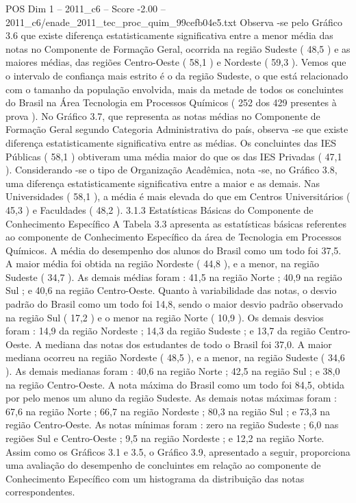 \begin{textsample}{POS Dim 1 – 2011\_c6 – Score -2.00 – 2011\_c6/enade\_2011\_tec\_proc\_quim\_99cefb04e5.txt}
Observa -se pelo Gráfico 3.6 que existe diferença estatisticamente significativa entre a menor média das notas no Componente de Formação Geral, ocorrida na região Sudeste ( 48,5 ) e as maiores médias, das regiões Centro-Oeste ( 58,1 ) e Nordeste ( 59,3 ).
Vemos que o intervalo de confiança mais estrito é o da região Sudeste, o que está relacionado com o tamanho da população envolvida, mais da metade de todos os concluintes do Brasil na Área Tecnologia em Processos Químicos ( 252 dos 429 presentes à prova ).
No Gráfico 3.7, que representa as notas médias no Componente de Formação Geral segundo Categoria Administrativa do país, observa -se que existe diferença estatisticamente significativa entre as médias.
Os concluintes das IES Públicas ( 58,1 ) obtiveram uma média maior do que os das IES Privadas ( 47,1 ).
Considerando -se o tipo de Organização Acadêmica, nota -se, no Gráfico 3.8, uma diferença estatisticamente significativa entre a maior e as demais.
Nas Universidades ( 58,1 ), a média é mais elevada do que em Centros Universitários ( 45,3 ) e Faculdades ( 48,2 ). 3.1.3 Estatísticas Básicas do Componente de Conhecimento Específico A Tabela 3.3 apresenta as estatísticas básicas referentes ao componente de Conhecimento Específico da área de Tecnologia em Processos Químicos.
A média do desempenho dos alunos do Brasil como um todo foi 37,5.
A maior média foi obtida na região Nordeste ( 44,8 ), e a menor, na região Sudeste ( 34,7 ).
As demais médias foram : 41,5 na região Norte ; 40,9 na região Sul ; e 40,6 na região Centro-Oeste.
Quanto à variabilidade das notas, o desvio padrão do Brasil como um todo foi 14,8, sendo o maior desvio padrão observado na região Sul ( 17,2 ) e o menor na região Norte ( 10,9 ).
Os demais desvios foram : 14,9 da região Nordeste ; 14,3 da região Sudeste ; e 13,7 da região Centro-Oeste.
A mediana das notas dos estudantes de todo o Brasil foi 37,0.
A maior mediana ocorreu na região Nordeste ( 48,5 ), e a menor, na região Sudeste ( 34,6 ).
As demais medianas foram : 40,6 na região Norte ; 42,5 na região Sul ; e 38,0 na região Centro-Oeste.
A nota máxima do Brasil como um todo foi 84,5, obtida por pelo menos um aluno da região Sudeste.
As demais notas máximas foram : 67,6 na região Norte ; 66,7 na região Nordeste ; 80,3 na região Sul ; e 73,3 na região Centro-Oeste.
As notas mínimas foram : zero na região Sudeste ; 6,0 nas regiões Sul e Centro-Oeste ; 9,5 na região Nordeste ; e 12,2 na região Norte.
Assim como os Gráficos 3.1 e 3.5, o Gráfico 3.9, apresentado a seguir, proporciona uma avaliação do desempenho de concluintes em relação ao componente de Conhecimento Específico com um histograma da distribuição das notas correspondentes.

\end{textsample}
